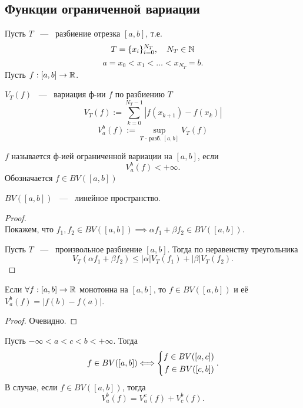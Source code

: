 \subsection{Функции ограниченной вариации}
\begin{definition}
	Пусть $T$ ~---~ разбиение отрезка $[a, b]$, т.е. \[
		T = \{x_i\}_{i=0}^{N_T}, \quad N_T \in \mathbb{N}
	\]\[
		a = x_0 < x_1 < \dots < x_{N_T} = b.
	\]
	Пусть $f: [a, b] \rightarrow \mathbb{R}$.
	
	$V_T(f)$ ~---~ вариация ф-ии $f$ по разбиению $T$\[
		V_T(f) := \sum_{k=0}^{N_T-1} |f(x_{k+1}) - f(x_k)|
	\]
	\[
		V_a^b(f) := \sup_{T\text{ - разб. } [a, b]} V_T(f)
	\]
\end{definition}
\begin{definition}
	$f$ называется ф-ией ограниченной вариации на $[a, b]$, если\[
	V_a^b (f) < +\infty.
	\]
	Обозначается $f\in BV([a, b])$
\end{definition}
\begin{theorem}
	$BV([a,b])$ ~---~ линейное пространство.
\end{theorem}
\begin{proof} \ \\
	Покажем, что $f_1, f_2 \in BV([a, b]) \implies \alpha f_1 + \beta f_2 \in BV([a, b])$.
	
	Пусть $T$ ~---~ произвольное разбиение $[a, b]$. Тогда по неравенству треугольника \[
		V_T(\alpha f_1 + \beta f_2)
		\leq
		|\alpha| V_T(f_1) + |\beta| V_T(f_2).
	\]
\end{proof}
\begin{lemma}
	Если $\forall f: [a, b] \rightarrow \mathbb{R}$ монотонна на $[a, b]$, то $f \in BV([a, b])$ и её $V_a^b (f) = |f(b) - f(a)|$.
\end{lemma}
\begin{proof}
	Очевидно.
\end{proof}
\begin{lemma}
	Пусть $-\infty < a < c < b < +\infty$. Тогда
	\[
	f \in BV([a, b]) \Longleftrightarrow \left\{\begin{aligned}f \in BV([a, c]) \\ f \in BV([c, b])\end{aligned}\right..
	\]
	В случае, если $f \in BV([a, b])$, тогда \[
		V_a^b (f) = V_a^c (f) + V_c^b (f).
	\]
\end{lemma}
